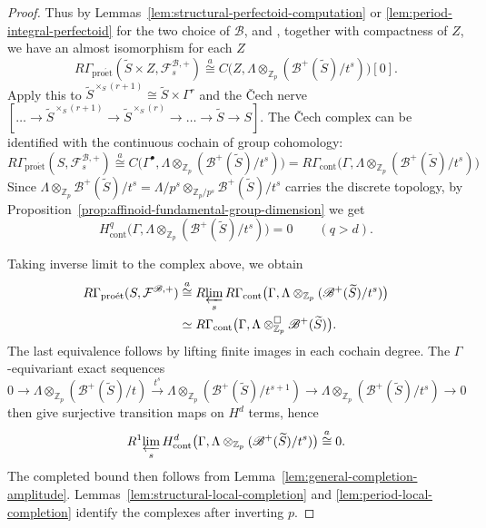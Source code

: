 \documentclass[11pt]{article}
\theoremstyle{definition}
\newcommand{\Zp}{\mathbb Z_p}
\newcommand{\proet}{\mathrm{pro\acute et}}
\newcommand{\acong}{\mathrel{\overset{a}{\cong}}}
\begin{document}
\begin{proof}
Thus by Lemmas~\ref{lem:structural-perfectoid-computation} or
\ref{lem:period-integral-perfectoid} for the two choice of $\mathscr{B}$, and
\cite[Proposition~4.7]{BoscoDrinfeld}, together with compactness of $Z$, we have an almost isomorphism for each $Z$
\begin{equation}\label{eq:geometric-integral-profinite-parameters}
 R\Gamma_{\proet}(\widetilde{S}\times Z,\mathcal F_s^{\mathscr B,+})
 \acong C\bigl(Z,\Lambda\otimes_{\Zp}
 (\mathscr B^+(\widetilde{S})/t^s)\bigr)[0].
\end{equation}
Apply this to
\(\widetilde{S}^{\times_{S}(r+1)}\cong \widetilde{S}\times\Gamma^r\) and the \v Cech nerve $[\dots\to\widetilde{S}^{\times_S(r+1)}\to\widetilde{S}^{\times_S(r)}\to\dots\to\widetilde{S}\to S]$.
The \v Cech complex can be identified with the continuous cochain of group cohomology:
\[
 R\Gamma_{\proet}(S,\mathcal F_s^{\mathscr B,+})
 \acong C\bigl(\Gamma^\bullet,\Lambda\otimes_{\Zp}
 (\mathscr B^+(\widetilde{S})/t^s)\bigr)= R\Gamma_{\mathrm{cont}}\bigl(\Gamma,
 \Lambda\otimes_{\Zp}(\mathscr B^+(\widetilde{S})/t^s)\bigr)
\]
Since $\Lambda\otimes_{\mathbb{Z}_p}\mathscr{B}^+(\widetilde{S})/t^s=\Lambda/p^s\otimes_{\mathbb{Z}_p/p^s}\mathscr{B}^+(\widetilde{S})/t^s$ 
carries the discrete topology, by Proposition~\ref{prop:affinoid-fundamental-group-dimension} we get
\[
 H^q_{\mathrm{cont}}\bigl(\Gamma,
 \Lambda\otimes_{\Zp}(\mathscr B^+(\widetilde{S})/t^s)\bigr)=0
 \qquad(q>d).
\]

Taking inverse limit to the complex above, we obtain
\begin{align*}
 R\Gamma_{\proet}(S,\mathcal F^{\mathscr B,+})
 &\acong R\!\varprojlim_s R\Gamma_{\mathrm{cont}}\bigl(\Gamma,
 \Lambda\otimes_{\Zp}(\mathscr B^+(\widetilde{S})/t^s)\bigr)\\
 &\simeq R\Gamma_{\mathrm{cont}}\bigl(\Gamma,
 \Lambda\otimes_{\Zp}^{\square}\mathscr B^+(\widetilde{S})\bigr).
\end{align*}
The last equivalence follows by lifting finite images in each
cochain degree.  The \(\Gamma\)-equivariant exact sequences
\[
 0\longrightarrow
 \Lambda\otimes_{\Zp}(\mathscr B^+(\widetilde{S})/t)\xrightarrow{t^s}
 \Lambda\otimes_{\Zp}(\mathscr B^+(\widetilde{S})/t^{s+1})\longrightarrow
 \Lambda\otimes_{\Zp}(\mathscr B^+(\widetilde{S})/t^s)
 \longrightarrow0
\]
then give surjective transition maps on \(H^d\) terms, hence
\[
 R^1\!\varprojlim_s H^d_{\mathrm{cont}}\bigl(\Gamma,
 \Lambda\otimes_{\Zp}(\mathscr B^+(\widetilde{S})/t^s)\bigr)\acong0.
\] The completed bound then follows from 
Lemma~\ref{lem:general-completion-amplitude}.  Lemmas~\ref{lem:structural-local-completion} and
\ref{lem:period-local-completion} identify the complexes after inverting $p$.
\end{proof}
\end{document}
